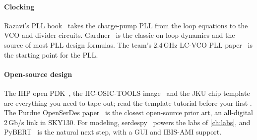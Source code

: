 \paragraph{Clocking} Razavi's PLL book~\cite{razaviPLL} takes the charge-pump PLL from the loop equations to the VCO and divider circuits. Gardner~\cite{gardner2005} is the classic on loop dynamics and the source of most PLL design formulas. The team's 2.4\,GHz LC-VCO PLL paper~\cite{smacd2026pll} is the starting point for the \OS{} PLL.

\paragraph{Open-source design} The IHP \sgx{} open PDK~\cite{ihppdk}, the IIC-OSIC-TOOLS image~\cite{iicosic} and the JKU chip template~\cite{jkutemplate} are everything you need to tape out; read the template tutorial before your first . The Purdue OpenSerDes paper~\cite{openserdes2021} is the closest open-source prior art, an all-digital 2\,Gb/s link in SKY130. For modeling, serdespy~\cite{serdespy} powers the labs of \cref{ch:labs}, and PyBERT~\cite{pybert} is the natural next step, with a GUI and IBIS-AMI support.
